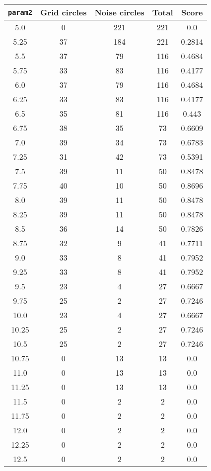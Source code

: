 \documentclass[letterpaper, 12pt]{article}
\begin{document}
\begin{longtable}{|c|c|c|c|c|}
\hline
\textbf{\texttt{param2}} & \textbf{Grid circles} & \textbf{Noise circles} & \textbf{Total} & \textbf{Score} \\
\hline
5.0 & 0 & 221 & 221 & 0.0 \\
\hline
5.25 & 37 & 184 & 221 & 0.2814 \\
\hline
5.5 & 37 & 79 & 116 & 0.4684 \\
\hline
5.75 & 33 & 83 & 116 & 0.4177 \\
\hline
6.0 & 37 & 79 & 116 & 0.4684 \\
\hline
6.25 & 33 & 83 & 116 & 0.4177 \\
\hline
6.5 & 35 & 81 & 116 & 0.443 \\
\hline
6.75 & 38 & 35 & 73 & 0.6609 \\
\hline
7.0 & 39 & 34 & 73 & 0.6783 \\
\hline
7.25 & 31 & 42 & 73 & 0.5391 \\
\hline
7.5 & 39 & 11 & 50 & 0.8478 \\
\hline
7.75 & 40 & 10 & 50 & 0.8696 \\
\hline
8.0 & 39 & 11 & 50 & 0.8478 \\
\hline
8.25 & 39 & 11 & 50 & 0.8478 \\
\hline
8.5 & 36 & 14 & 50 & 0.7826 \\
\hline
8.75 & 32 & 9 & 41 & 0.7711 \\
\hline
9.0 & 33 & 8 & 41 & 0.7952 \\
\hline
9.25 & 33 & 8 & 41 & 0.7952 \\
\hline
9.5 & 23 & 4 & 27 & 0.6667 \\
\hline
9.75 & 25 & 2 & 27 & 0.7246 \\
\hline
10.0 & 23 & 4 & 27 & 0.6667 \\
\hline
10.25 & 25 & 2 & 27 & 0.7246 \\
\hline
10.5 & 25 & 2 & 27 & 0.7246 \\
\hline
10.75 & 0 & 13 & 13 & 0.0 \\
\hline
11.0 & 0 & 13 & 13 & 0.0 \\
\hline
11.25 & 0 & 13 & 13 & 0.0 \\
\hline
11.5 & 0 & 2 & 2 & 0.0 \\
\hline
11.75 & 0 & 2 & 2 & 0.0 \\
\hline
12.0 & 0 & 2 & 2 & 0.0 \\
\hline
12.25 & 0 & 2 & 2 & 0.0 \\
\hline
12.5 & 0 & 2 & 2 & 0.0 \\

\end{longtable}
\end{document}
